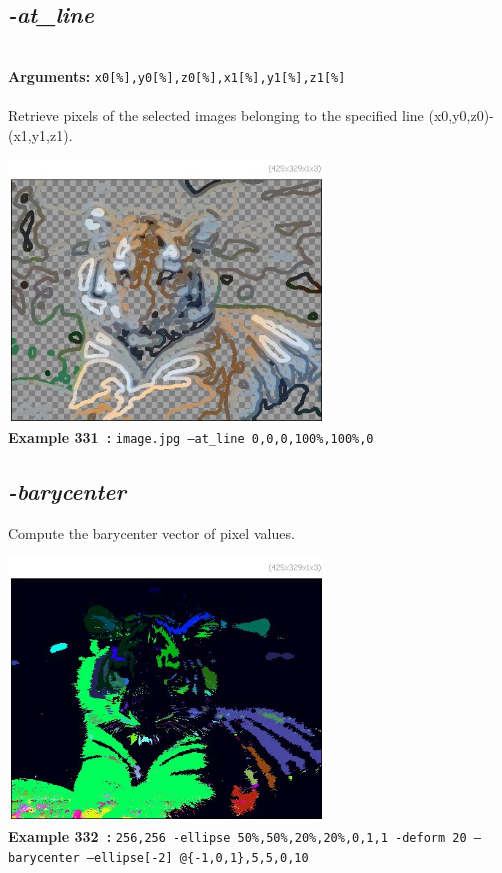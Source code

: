 \documentclass[a4paper,11pt,twoside]{book}
\begin{document}
\subsection{\emph{-at\_line} }\vspace*{-0.5em}
~\\\textbf{Arguments: } 
{\small \texttt{x0[\%],y0[\%],z0[\%],x1[\%],y1[\%],z1[\%]}}\\~\\
Retrieve pixels of the selected images belonging to the specified line (x0,y0,z0)-(x1,y1,z1).
\begin{center}\includegraphics[keepaspectratio=true,height=7cm,width=\textwidth]{img/gmic_def331.jpg}\\
{\footnotesize \textbf{Example 331~:} \texttt{image.jpg --at\_line 0,0,0,100\%,100\%,0}}
\end{center}

\subsection{\emph{-barycenter} }\vspace*{-0.5em}
Compute the barycenter vector of pixel values.
\begin{center}\includegraphics[keepaspectratio=true,height=7cm,width=\textwidth]{img/gmic_def332.jpg}\\
{\footnotesize \textbf{Example 332~:} \texttt{256,256 -ellipse 50\%,50\%,20\%,20\%,0,1,1 -deform 20 --barycenter --ellipse[-2] @\{-1,0,1\},5,5,0,10}}
\end{center}
\end{document}
